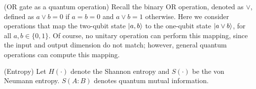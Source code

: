 \begin{questions}
  \question[15] (OR gate as a quantum operation) Recall the binary OR
  operation, denoted as $\vee$, defined as $a \vee b = 0$ if
  $a = b = 0$ and $a\vee b = 1$ otherwise. Here we consider operations
  that map the two-qubit state $\lvert a, b \rangle$ to the one-qubit state
  $\lvert a\vee b \rangle$, for all $a,b \in \{0,1\}$. Of course, no unitary
  operation can perform this mapping, since the input and output
  dimension do not match; however, general quantum operations can
  compute this mapping.

  

  \question (Entropy) Let $H(\cdot)$ denote the Shannon entropy and
  $S(\cdot)$ be the von Neumann entropy. $S(A:B)$ denotes quantum
  mutual information.
  \begin{parts}

\end{parts}
\end{questions}
